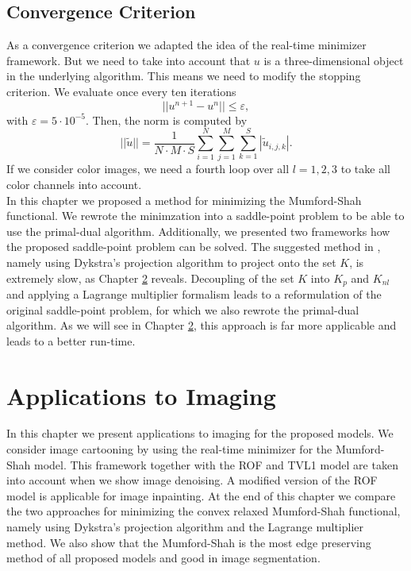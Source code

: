 \documentclass[abstracton]{scrreprt}
\begin{document}
    \section{Convergence Criterion} %
    \label{sec:convergence_criterion}
    
        As a convergence criterion we adapted the idea of the real-time minimizer framework. But we need to take into account that $u$ is a three-dimensional object in the underlying algorithm. This means we need to modify the stopping criterion. We evaluate once every ten iterations
            $$
                ||u^{n+1} - u^{n}|| \le \varepsilon,
            $$
        with $\varepsilon = 5 \cdot 10^{-5}$. Then, the norm is computed by
            $$
                ||\tilde{u}|| = \frac{1}{N \cdot M \cdot S} \sum_{i = 1}^{N} \sum_{j = 1}^{M} \sum_{k = 1}^{S} |\tilde{u}_{i,j,k}|.
            $$
        If we consider color images, we need a fourth loop over all $l = 1, 2, 3$ to take all color channels into account.\\


    In this chapter we proposed a method for minimizing the Mumford-Shah functional. We rewrote the minimzation into a saddle-point problem to be able to use the primal-dual algorithm. Additionally, we presented two frameworks how the proposed saddle-point problem can be solved. The suggested method in \cite{Pock-et-al-iccv09}, namely using Dykstra's projection algorithm to project onto the set $K$, is extremely slow, as Chapter \ref{cha:applications_to_imaging} reveals. Decoupling of the set $K$ into $K_{p}$ and $K_{nl}$ and applying a Lagrange multiplier formalism leads to a reformulation of the original saddle-point problem, for which we also rewrote the primal-dual algorithm. As we will see in Chapter \ref{cha:applications_to_imaging}, this approach is far more applicable and leads to a better run-time.


\chapter{Applications to Imaging} %
\label{cha:applications_to_imaging}

    In this chapter we present applications to imaging for the proposed models. We consider image cartooning by using the real-time minimizer for the Mumford-Shah model. This framework together with the ROF and TVL1 model are taken into account when we show image denoising. A modified version of the ROF model is applicable for image inpainting. At the end of this chapter we compare the two approaches for minimizing the convex relaxed Mumford-Shah functional, namely using Dykstra's projection algorithm and the Lagrange multiplier method. We also show that the Mumford-Shah is the most edge preserving method of all proposed models and good in image segmentation.
\end{document}
